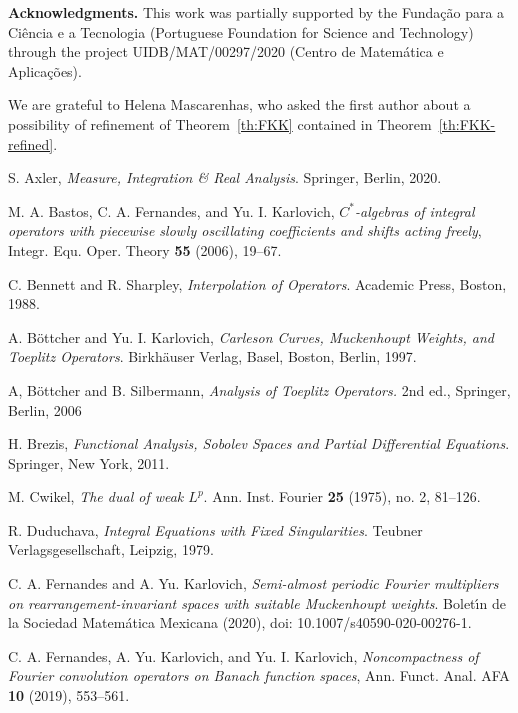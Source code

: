\documentclass[reqno]{amsproc}
\theoremstyle{definition}
\theoremstyle{remark}
\numberwithin{equation}{section}
\begin{document}
\bigskip
\textbf{Acknowledgments.} 
This work was partially supported by the Funda\c{c}\~ao para a Ci\^encia e a
Tecnologia (Portu\-guese Foundation for Science and Technology)
through the project
UIDB/MAT/00297/2020 (Centro de Matem\'atica e Aplica\c{c}\~oes).

We are grateful to Helena Mascarenhas, who asked the first author about
a possibility of refinement of Theorem~\ref{th:FKK} contained in 
Theorem~\ref{th:FKK-refined}.

\begin{thebibliography}{99}
S. Axler,
\textit{Measure, Integration \& Real Analysis}.
Springer, Berlin, 2020.

M. A. Bastos, C. A. Fernandes, and Yu. I. Karlovich,
\textit{$C^*$-algebras of integral operators with piecewise slowly
oscillating coefficients and shifts acting freely},
Integr. Equ. Oper. Theory \textbf{55} (2006), 19--67.

C. Bennett and R. Sharpley, 
\textit{Interpolation of Operators}.
Academic Press, Boston, 1988. 

A. B\"ottcher and Yu. I. Karlovich,
\textit{Carleson Curves, Muckenhoupt Weights, and Toeplitz Operators}.
Birkh\"auser Verlag, Basel, Boston, Berlin, 1997.

A, B\"ottcher and B. Silbermann,
\textit{Analysis of Toeplitz Operators.}
2nd ed., Springer, Berlin, 2006

H. Brezis, 
\textit{Functional Analysis, Sobolev Spaces and Partial Differential 
Equations}.
Springer, New York, 2011.

M. Cwikel,
\textit{The dual of weak $L^p$}.
Ann. Inst. Fourier \textbf{25} (1975), no. 2, 81--126.

R. Duduchava, 
\textit{Integral Equations with Fixed Singularities}.
Teubner Verlagsgesellschaft, Leipzig, 1979.

C. A. Fernandes and A. Yu. Karlovich, 
\textit{Semi-almost periodic Fourier multipliers on rearrangement-invariant 
spaces with suitable Muckenhoupt weights}. 
Bolet{\'\i}n de la Sociedad Matem\'atica Mexicana (2020),
doi: 10.1007/s40590-020-00276-1.

C. A. Fernandes, A. Yu. Karlovich, and Yu. I. Karlovich,
\textit{Noncompactness of Fourier convolution operators on Banach function
spaces},
Ann. Funct. Anal. AFA \textbf{10} (2019), 553--561.


\end{thebibliography}
\end{document}
